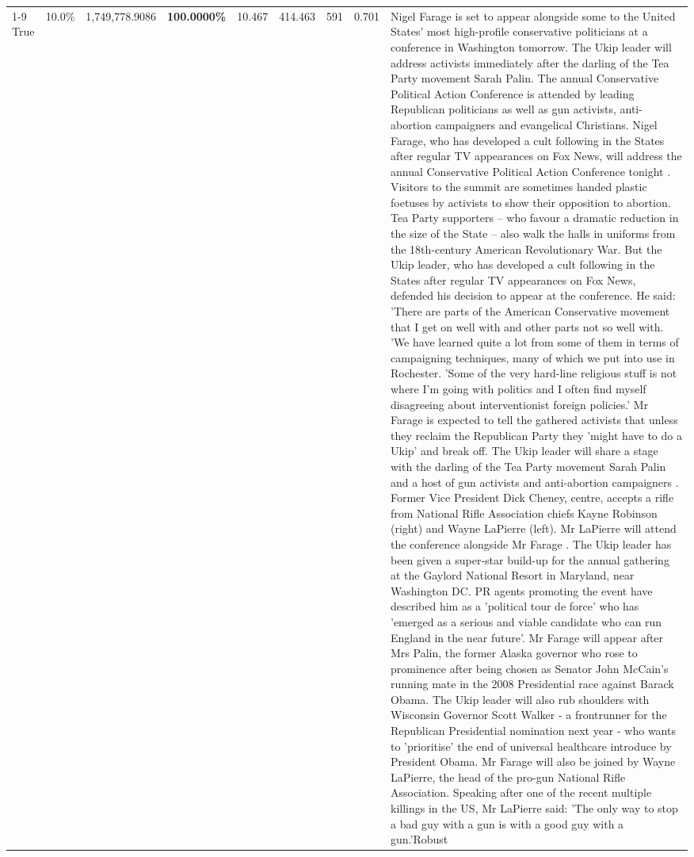 \begin{table}[H]
\begin{tabular}{lllrlllll}
\cline{1-9}
True & 10.0\% & 1,749,778.9086 & \bfseries \color{red} 100.0000\% & 10.467 & 414.463 & 591 & 0.701 & Nigel Farage is set to appear alongside some to the United States' most high-profile conservative politicians at a conference in Washington tomorrow. The Ukip leader will address activists immediately after the darling of the Tea Party movement Sarah Palin. The annual Conservative Political Action Conference is attended by leading Republican politicians as well as gun activists, anti-abortion campaigners and evangelical Christians. Nigel Farage, who has developed a cult following in the States after regular TV appearances on Fox News, will address the annual Conservative Political Action Conference tonight . Visitors to the summit are sometimes handed plastic foetuses by activists to show their opposition to abortion. Tea Party supporters – who favour a dramatic reduction in the size of the State – also walk the halls in uniforms from the 18th-century American Revolutionary War. But the Ukip leader, who has developed a cult following in the States after regular TV appearances on Fox News, defended his decision to appear at the conference. He said: 'There are parts of the American Conservative movement that I get on well with and other parts not so well with. 'We have learned quite a lot from some of them in terms of campaigning techniques, many of which we put into use in Rochester. 'Some of the very hard-line religious stuff is not where I'm going with politics and I often find myself disagreeing about interventionist foreign policies.' Mr Farage is expected to tell the gathered activists that unless they reclaim the Republican Party they 'might have to do a Ukip' and break off. The Ukip leader will share a stage with the darling of the Tea Party movement Sarah Palin and a host of gun activists and anti-abortion campaigners . Former Vice President Dick Cheney, centre, accepts a rifle from National Rifle Association chiefs Kayne Robinson (right) and Wayne LaPierre (left). Mr LaPierre will attend the conference alongside Mr Farage . The Ukip leader has been given a super-star build-up for the annual gathering at the Gaylord National Resort in Maryland, near Washington DC. PR agents promoting the event have described him as a 'political tour de force' who has 'emerged as a serious and viable candidate who can run England in the near future'. Mr Farage will appear after Mrs Palin, the former Alaska governor who rose to prominence after being chosen as Senator John McCain's running mate in the 2008 Presidential race against Barack Obama. The Ukip leader will also rub shoulders with Wisconsin Governor Scott Walker - a frontrunner for the Republican Presidential nomination next year - who wants to 'prioritise' the end of universal healthcare introduce by President Obama. Mr Farage will also be joined by Wayne LaPierre, the head of the pro-gun National Rifle Association. Speaking after one of the recent multiple killings in the US, Mr LaPierre said: 'The only way to stop a bad guy with a gun is with a good guy with a gun.'Robust \\

\end{tabular}
\end{table}
